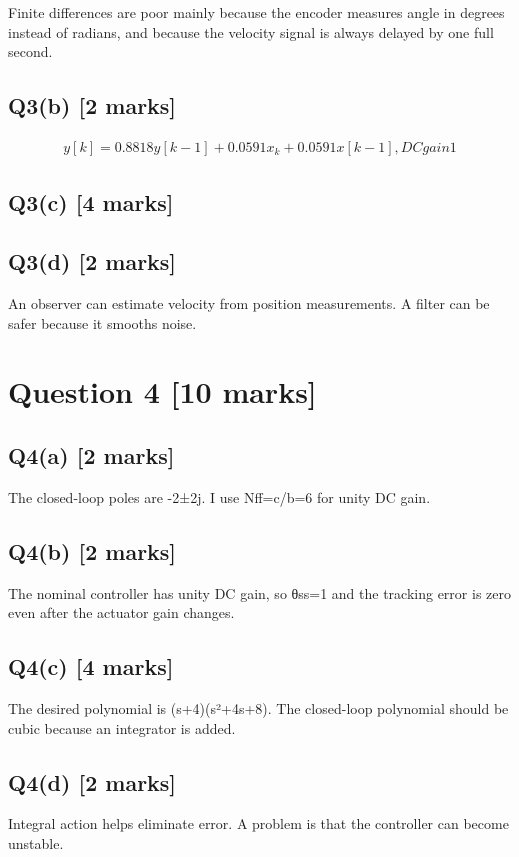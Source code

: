 \documentclass[11pt,a4paper]{article}
\begin{document}
Finite differences are poor mainly because the encoder measures angle in degrees instead of radians, and because the velocity signal is always delayed by one full second.

\subsection*{Q3(b) \hfill [2 marks]}

\[\begin{aligned}y[k]=0.8818y[k-1]+0.0591x_k+0.0591x[k-1], DC gain 1\end{aligned}\]

\subsection*{Q3(c) \hfill [4 marks]}

\vspace{2mm}

\subsection*{Q3(d) \hfill [2 marks]}

An observer can estimate velocity from position measurements.
A filter can be safer because it smooths noise.

\section*{Question 4 \hfill [10 marks]}
\subsection*{Q4(a) \hfill [2 marks]}

The closed-loop poles are -2±2j.
I use Nff=c/b=6 for unity DC gain.

\subsection*{Q4(b) \hfill [2 marks]}

The nominal controller has unity DC gain, so θss=1 and the tracking error is zero even after the actuator gain changes.

\subsection*{Q4(c) \hfill [4 marks]}

The desired polynomial is (s+4)(s²+4s+8).
The closed-loop polynomial should be cubic because an integrator is added.

\subsection*{Q4(d) \hfill [2 marks]}

Integral action helps eliminate error.
A problem is that the controller can become unstable.
\end{document}
